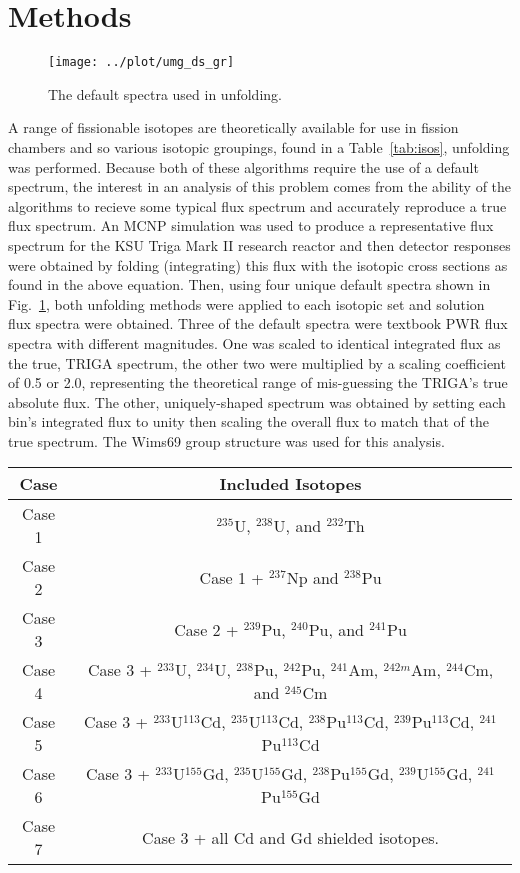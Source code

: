 \documentclass[journal]{IEEEtran}
\newcommand{\FIG}[1]{Fig.~\ref{#1}}               %
\newcommand{\TAB}[1]{Table~\ref{#1}}              %
\begin{document}
\section{Methods}

\begin{figure}[h!tb]
  \centering
  \texttt{[image: ../plot/umg\_ds\_gr]}
  \caption{The default spectra used in unfolding.}
  \label{fig:default_spectra}
\end{figure}

A range of fissionable isotopes are theoretically available for use in fission chambers and so various isotopic groupings, found in a \TAB{tab:isos}, unfolding was performed.
Because both of these algorithms require the use of a default spectrum, the interest in an analysis of this problem comes from the ability of the algorithms to recieve some typical flux spectrum and accurately reproduce a true flux spectrum.
An MCNP simulation was used to produce a representative flux spectrum for the KSU Triga Mark II research reactor and then detector responses were obtained by folding (integrating) this flux with the isotopic cross sections as found in the above equation.
Then, using four unique default spectra shown in \FIG{fig:default_spectra}, both unfolding methods were applied to each isotopic set and solution flux spectra were obtained.
Three of the default spectra were textbook PWR flux spectra with different magnitudes.
One was scaled to identical integrated flux as the true, TRIGA spectrum, the other two were multiplied by a scaling coefficient of 0.5 or 2.0, representing the theoretical range of mis-guessing the TRIGA's true absolute flux.
The other, uniquely-shaped spectrum was obtained by setting each bin's integrated flux to unity then scaling the overall flux to match that of the true spectrum.
The Wims69 group structure was used for this analysis.

\begin{table*}[h]
\centering
\begin{tabular}{ |c|c| }
 \hline
 \textbf{Case} & \textbf{Included Isotopes} \\
 \hline
 Case 1 & ${}^{235}$U, ${}^{238}$U, and ${}^{232}$Th \\
 \hline
 Case 2 & Case 1 + ${}^{237}$Np and ${}^{238}$Pu \\
 \hline
 Case 3 & Case 2 + ${}^{239}$Pu, ${}^{240}$Pu, and ${}^{241}$Pu \\
 \hline
 Case 4 & Case 3 + ${}^{233}$U, ${}^{234}$U, ${}^{238}$Pu, ${}^{242}$Pu, ${}^{241}$Am, ${}^{242m}$Am, ${}^{244}$Cm, and ${}^{245}$Cm \\
 \hline
 Case 5 & Case 3 + ${}^{233}$U${}^{113}$Cd, ${}^{235}$U${}^{113}$Cd, ${}^{238}$Pu${}^{113}$Cd, ${}^{239}$Pu${}^{113}$Cd, ${}^{241}$Pu${}^{113}$Cd \\
 \hline
 Case 6 & Case 3 + ${}^{233}$U${}^{155}$Gd, ${}^{235}$U${}^{155}$Gd, ${}^{238}$Pu${}^{155}$Gd, ${}^{239}$U${}^{155}$Gd, ${}^{241}$Pu${}^{155}$Gd \\
 \hline
 Case 7 & Case 3 + all Cd and Gd shielded isotopes. \\
 \hline
\end{tabular} \label{tab:isos}
\end{table*}
\end{document}
